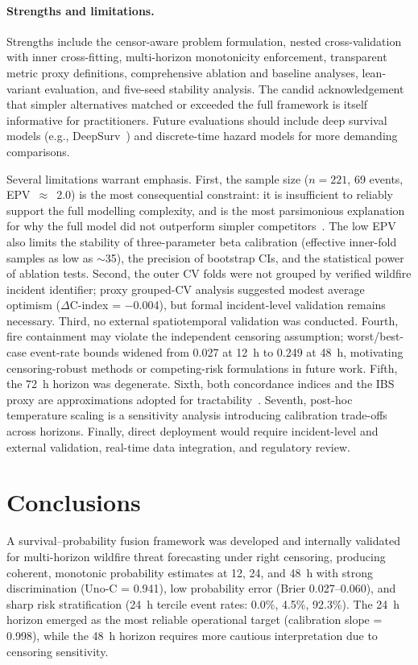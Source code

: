 \documentclass[fire,article,submit,pdftex]{../Definitions/mdpi}
\begin{document}
\paragraph{Strengths and limitations.}
Strengths include the censor-aware problem formulation, nested cross-validation with inner cross-fitting, multi-horizon monotonicity enforcement, transparent metric proxy definitions, comprehensive ablation and baseline analyses, lean-variant evaluation, and five-seed stability analysis.
The candid acknowledgement that simpler alternatives matched or exceeded the full framework is itself informative for practitioners.
Future evaluations should include deep survival models (e.g., DeepSurv~\cite{Katzman2018}) and discrete-time hazard models for more demanding comparisons.

Several limitations warrant emphasis.
First, the sample size ($n = 221$, 69 events, EPV~$\approx$~2.0) is the most consequential constraint: it is insufficient to reliably support the full modelling complexity, and is the most parsimonious explanation for why the full model did not outperform simpler competitors~\cite{Riley2020}.
The low EPV also limits the stability of three-parameter beta calibration (effective inner-fold samples as low as $\sim$35), the precision of bootstrap CIs, and the statistical power of ablation tests.
Second, the outer CV folds were not grouped by verified wildfire incident identifier; proxy grouped-CV analysis suggested modest average optimism ($\Delta$C-index = $-$0.004), but formal incident-level validation remains necessary.
Third, no external spatiotemporal validation was conducted.
Fourth, fire containment may violate the independent censoring assumption; worst/best-case event-rate bounds widened from 0.027 at 12~h to 0.249 at 48~h, motivating censoring-robust methods or competing-risk formulations in future work.
Fifth, the 72~h horizon was degenerate.
Sixth, both concordance indices and the IBS proxy are approximations adopted for tractability~\cite{Harrell1996,Uno2011,Graf1999}.
Seventh, post-hoc temperature scaling is a sensitivity analysis introducing calibration trade-offs across horizons.
Finally, direct deployment would require incident-level and external validation, real-time data integration, and regulatory review.

\section{Conclusions}\label{sec:conclusions}

A survival--probability fusion framework was developed and internally validated for multi-horizon wildfire threat forecasting under right censoring, producing coherent, monotonic probability estimates at 12, 24, and 48~h with strong discrimination (Uno-C = 0.941), low probability error (Brier 0.027--0.060), and sharp risk stratification (24~h tercile event rates: 0.0\%, 4.5\%, 92.3\%).
The 24~h horizon emerged as the most reliable operational target (calibration slope = 0.998), while the 48~h horizon requires more cautious interpretation due to censoring sensitivity.
\end{document}

